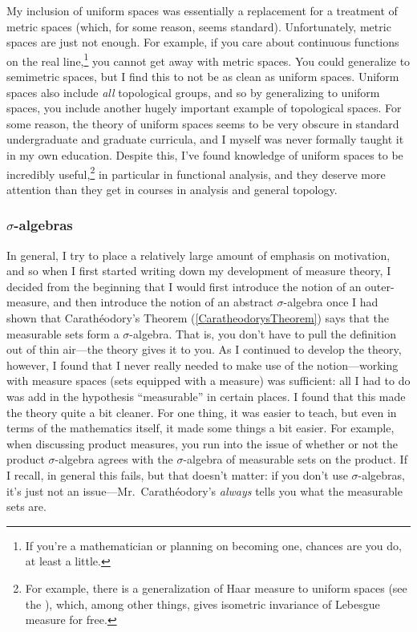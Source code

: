 My inclusion of uniform spaces was essentially a replacement for a treatment of metric spaces (which, for some reason, seems standard).  Unfortunately, metric spaces are just not enough.  For example, if you care about continuous functions on the real line,\footnote{If you're a mathematician or planning on becoming one, chances are you do, at least a little.} you cannot get away with metric spaces.  You could generalize to semimetric spaces, but I find this to not be as clean as uniform spaces.  Uniform spaces also include \emph{all} topological groups, and so by generalizing to uniform spaces, you include another hugely important example of topological spaces.  For some reason, the theory of uniform spaces seems to be very obscure in standard undergraduate and graduate curricula, and I myself was never formally taught it in my own education.  Despite this, I've found knowledge of uniform spaces to be incredibly useful,\footnote{For example, there is a generalization of Haar measure to uniform spaces (see the ), which, among other things, gives isometric invariance of Lebesgue measure for free.} in particular in functional analysis, and they deserve more attention than they get in courses in analysis and general topology.

\subsubsection{\texorpdfstring{$\sigma$}{sigma}-algebras}

In general, I try to place a relatively large amount of emphasis on motivation, and so when I first started writing down my development of measure theory, I decided from the beginning that I would first introduce the notion of an outer-measure, and then introduce the notion of an abstract $\sigma$-algebra once I had shown that Carath\'{e}odory's Theorem (\cref{CaratheodorysTheorem}) says that the measurable sets form a $\sigma$-algebra.  That is, you don't have to pull the definition out of thin air---the theory gives it to you.  As I continued to develop the theory, however, I found that I never really needed to make use of the notion---working with measure spaces (sets equipped with a measure) was sufficient:  all I had to do was add in the hypothesis ``measurable'' in certain places.  I found that this made the theory quite a bit cleaner.  For one thing, it was easier to teach, but even in terms of the mathematics itself, it made some things a bit easier.  For example, when discussing product measures, you run into the issue of whether or not the product $\sigma$-algebra agrees with the $\sigma$-algebra of measurable sets on the product.  If I recall, in general this fails, but that doesn't matter:  if you don't use $\sigma$-algebras, it's just not an issue---Mr.~Carathéodory's \emph{always} tells you what the measurable sets are.

